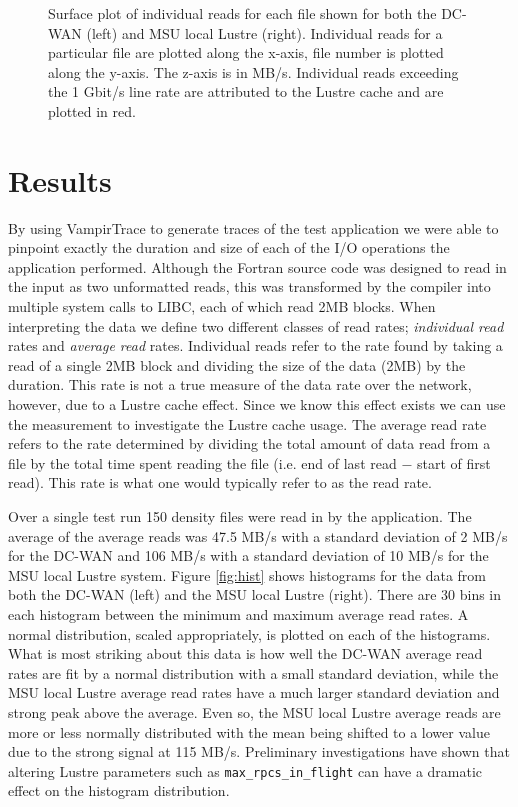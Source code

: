 \documentclass[]{sig-alternate}
\begin{document}
\begin{figure*}[t]
\centering
{}
\caption{Surface plot of individual reads for each file shown for both the DC-WAN (left) and MSU local Lustre (right). Individual reads for a particular file are plotted along the x-axis, file number is plotted along the y-axis. The z-axis is in MB/s. Individual reads exceeding the 1 Gbit/s line rate are attributed to the Lustre cache and are plotted in red.}
\label{fig:surf}
\end{figure*}

\section{Results}\label{sec:results}
By using VampirTrace to generate traces of the test application we were able to pinpoint exactly the duration and size of each of the I/O operations the application performed. Although the Fortran source code was designed to read in the input as two unformatted reads, this was transformed by the compiler into multiple system calls to LIBC, each of which read 2MB blocks. When interpreting the data we define two different classes of read rates; {\it individual read} rates and {\it average read} rates. Individual reads refer to the rate found by taking a read of a single 2MB block and dividing the size of the data (2MB) by the duration. This rate is not a true measure of the data rate over the network, however, due to a Lustre cache effect. Since we know this effect exists we can use the measurement to investigate the Lustre cache usage. The average read rate refers to the rate determined by dividing the total amount of data read from a file by the total time spent reading the file (i.e. end of last read $-$ start of first read). This rate is what one would typically refer to as the read rate. 

Over a single test run 150 density files were read in by the application. The average of the average reads was 47.5 MB/s with a standard deviation of 2 MB/s for the DC-WAN and 106 MB/s with a standard deviation of 10 MB/s for the MSU local Lustre system. Figure \ref{fig:hist} shows histograms for the data from both the DC-WAN (left) and the MSU local Lustre (right). There are 30 bins in each histogram between the minimum and maximum average read rates. A normal distribution, scaled appropriately, is plotted on each of the histograms. What is most striking about this data is how well the DC-WAN average read rates are fit by a normal distribution with a small standard deviation, while the MSU local Lustre average read rates have a much larger standard deviation and strong peak above the average. Even so, the MSU local Lustre average reads are more or less normally distributed with the mean being shifted to a lower value due to the strong signal at 115 MB/s. Preliminary investigations have shown that altering Lustre parameters such as {\tt max\_rpcs\_in\_flight} can have a dramatic effect on the histogram distribution.
\end{document}
